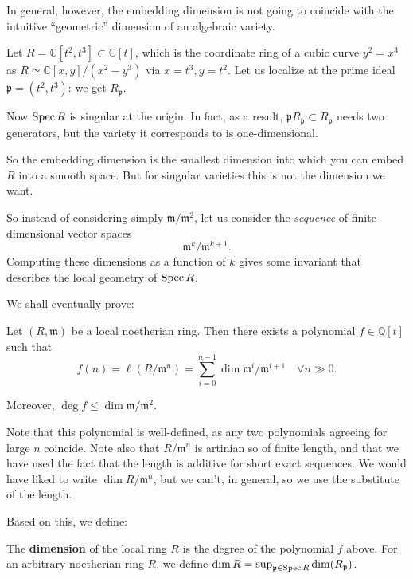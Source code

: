In general, however, the embedding dimension is not going to coincide with the
intuitive ``geometric'' dimension of an algebraic
variety.

\begin{example} 
Let $R = \mathbb{C}[t^2, t^3] \subset \mathbb{C}[t]$, which is the coordinate
ring of a cubic curve $y^2 =x^3$ as $R \simeq \mathbb{C}[x,y]/(x^2 - y^3)$
via $x = t^3, y = t^2$. Let us localize at the prime ideal $\mathfrak{p} = (t^2,
t^3)$: we get $R_{\mathfrak{p}}$. 

Now $\operatorname{Spec} R$ is singular at the origin. In fact, as a result, $\mathfrak{p}
R_{\mathfrak{p}} \subset R_{\mathfrak{p}}$ needs two generators, but the
variety it corresponds to is one-dimensional.
\end{example} 

So the embedding dimension is the smallest dimension into which you can embed
$R$ into a smooth space.
But for singular varieties this is not the dimension we want. 

So instead of considering simply $\mathfrak{m}/\mathfrak{m}^2$, let us
consider the \emph{sequence} of finite-dimensional vector spaces
\[ \mathfrak{m}^k/\mathfrak{m}^{k+1}.  \]
Computing these dimensions as a function of $k$ gives some invariant that describes the local
geometry of $\operatorname{Spec} R$.

We shall eventually prove:
\begin{theorem} \label{hilbfnispolynomial}
Let $(R, \mathfrak{m})$ be a local noetherian ring. Then there exists a
polynomial
$f \in \mathbb{Q}[t]$ such that
\[ f(n) =  \ell(R/\mathfrak{m}^n) = \sum_{i=0}^{n-1} \dim
\mathfrak{m}^i/\mathfrak{m}^{i+1} \quad \forall n \gg 0.  \]

Moreover, $\deg f \leq \dim \mathfrak{m}/\mathfrak{m}^2$.
\end{theorem}


Note that this polynomial is well-defined, as any two polynomials agreeing for large $n$
coincide. Note also that $R/\mathfrak{m}^n$ is artinian so of finite length,
and that we have used the fact that the length is additive for short exact
sequences. We would have liked to write $\dim R/\mathfrak{m}^n$, but we can't,
in general, so we use the substitute of the length. 

Based on this, we define:
\begin{definition} 
The \textbf{dimension} of the local ring $R$ is the degree of the polynomial
$f$ above. For an arbitrary noetherian ring $R$, we define $\dim R =
\sup_{\mathfrak{p} \in \operatorname{Spec} R} \dim (R_{\mathfrak{p}})$.
\end{definition} 


